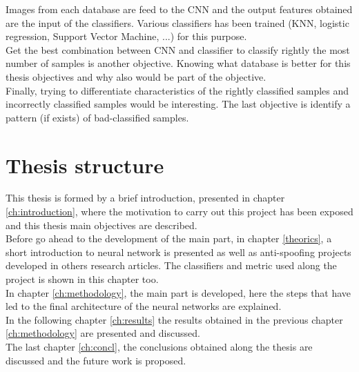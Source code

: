 Images from each database are feed to the CNN and the output features obtained are the input of the classifiers. Various classifiers has been trained (KNN, logistic regression, Support Vector Machine, ...) for this purpose.\\

Get the best combination between CNN and classifier to classify rightly the most number of samples is another objective. Knowing what database is better for this thesis objectives and why also would be part of the objective.\\

Finally, trying to differentiate characteristics of the rightly classified samples and incorrectly classified samples would be interesting. The last objective is identify a pattern (if exists) of bad-classified samples.\\

\section{Thesis structure}
This thesis is formed by a brief introduction, presented in chapter \ref{ch:introduction}, where the motivation to carry out this project has been exposed and this thesis main objectives are described.\\

Before go ahead to the development of the main part, in chapter \ref{theorics}, a short introduction to neural network is presented as well as anti-spoofing projects developed in others research articles. The classifiers and metric used along the project is shown in this chapter too.\\

In chapter \ref{ch:methodology}, the main part is developed, here the steps that have led to the final architecture of the neural networks are explained.\\

In the following chapter \ref{ch:results} the results obtained in the previous chapter \ref{ch:methodology} are presented and discussed.\\

The last chapter \ref{ch:concl}, the conclusions obtained along the thesis are discussed and the future work is proposed.\\
